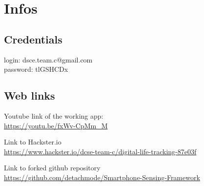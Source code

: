 \chapter*{Infos}
\section*{Credentials}
login: dsce.team.c@gmail.com \\
password: tlGSHCDx


\section*{Web links}
Youtube link of the working app: \\
\url{https://youtu.be/fxWv-CpMm_M}

Link to Hackster.io \\
\url{https://www.hackster.io/dcse-team-c/digital-life-tracking-87e03f}

Link to forked github repository \\
\url{https://github.com/detachmode/Smartphone-Sensing-Framework}